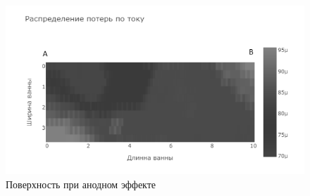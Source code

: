 \documentclass{article}
\begin{document}
\begin{figure}[H]
\hspace*{-5cm}\includegraphics[width=200mm]{анодный эффект.PNG}
\caption{Поверхность при анодном эффекте}
\end{figure}
\end{document}
